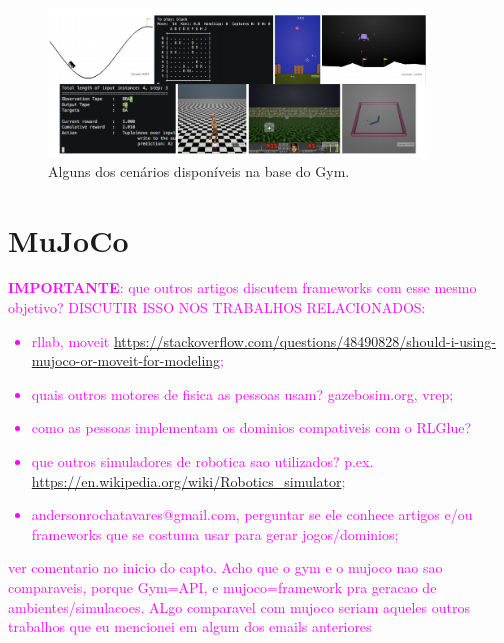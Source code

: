 \documentclass[cic,tc]{iiufrgs}
\newcommand\bruno[1]{\textcolor{magenta}{#1}}
\begin{document}
    
    
    \begin{figure}[h]
        \caption{Alguns dos cenários disponíveis na base do Gym.}
        \begin{center}
          \includegraphics[width=0.9\textwidth]{environments.png}
        \end{center}
        \label{fig:gymenvironments}
    \end{figure}
    
    
    \section{MuJoCo}
    
    \bruno{\textbf{IMPORTANTE}: que outros artigos discutem frameworks com esse mesmo objetivo? DISCUTIR ISSO NOS TRABALHOS RELACIONADOS:
    \begin{itemize}
        \item rllab, moveit \url{https://stackoverflow.com/questions/48490828/should-i-using-mujoco-or-moveit-for-modeling};
        \item quais outros motores de fisica as pessoas usam? gazebosim.org, vrep; 
        \item como as pessoas implementam os dominios compativeis com o RLGlue?
        \item que outros simuladores de robotica sao utilizados? p.ex. \url{https://en.wikipedia.org/wiki/Robotics_simulator};
        \item andersonrochatavares@gmail.com, perguntar se ele conhece artigos e/ou frameworks que se costuma usar para gerar jogos/dominios;
    \end{itemize}  
    }
    
    
    \bruno{ver comentario no inicio do capto. Acho que o gym e o mujoco nao sao comparaveis, porque Gym=API, e mujoco=framework pra geracao de ambientes/simulacoes. ALgo comparavel com mujoco seriam aqueles outros trabalhos que eu mencionei em algum dos emails anteriores}
    
\end{document}
